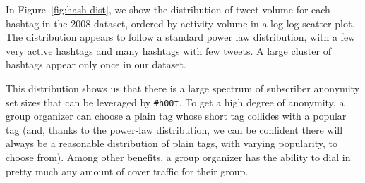 \documentclass{sig-alternate-arxiv}
\newcommand{\hoot}{{\tt \#h00t}\xspace}
\begin{document}
In Figure~\ref{fig:hash-dist}, we show the distribution of 
tweet volume for each hashtag in the 2008 dataset, ordered by activity
volume in a log-log scatter plot. The
distribution appears to follow a standard power law distribution, with a
few very active hashtags and many hashtags with few tweets. A large
cluster of hashtags appear only once in our dataset. 

This distribution shows us that there is a large spectrum of subscriber
anonymity set sizes that can be leveraged by \hoot. To get a high
degree of anonymity, a group organizer can choose a plain tag whose short tag
collides with a popular tag (and, thanks to the power-law
distribution, we can be confident there will always be a reasonable
distribution of plain tags, with varying popularity, to choose from).
Among other benefits, a group organizer has the ability to dial in
pretty much any amount of cover traffic for their group.


\end{document}
